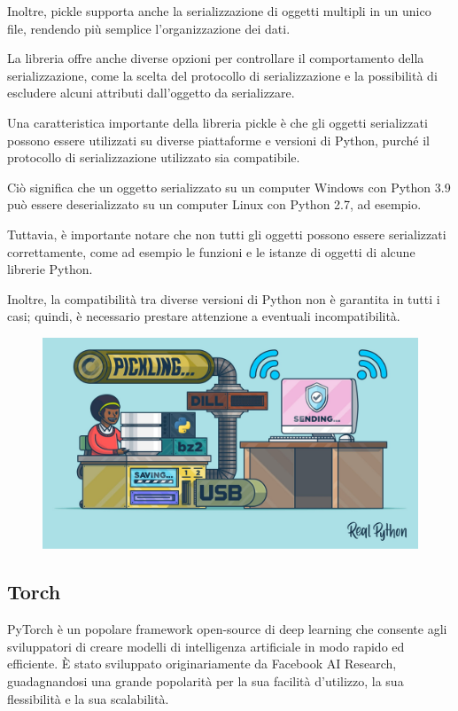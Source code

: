 Inoltre, pickle supporta anche la serializzazione di oggetti multipli in un unico file, rendendo più semplice l'organizzazione dei dati. 

La libreria offre anche diverse opzioni per controllare il comportamento della serializzazione, come la scelta del protocollo di serializzazione e la possibilità di escludere alcuni attributi dall'oggetto da serializzare.

Una caratteristica importante della libreria pickle è che gli oggetti serializzati possono essere utilizzati su diverse piattaforme e versioni di Python, purché il protocollo di serializzazione utilizzato sia compatibile. 

Ciò significa che un oggetto serializzato su un computer Windows con Python 3.9 può essere deserializzato su un computer Linux con Python 2.7, ad esempio. 

Tuttavia, è importante notare che non tutti gli oggetti possono essere serializzati correttamente, come ad esempio le funzioni e le istanze di oggetti di alcune librerie Python. 

Inoltre, la compatibilità tra diverse versioni di Python non è garantita in tutti i casi; quindi, è necessario prestare attenzione a eventuali incompatibilità.

\begin{figure}
    \begin{center}    
        \includegraphics[width=1\linewidth]{images/image6.jpeg}
    \end{center}
\end{figure}

\subsection{Torch}
PyTorch è un popolare framework open-source di deep learning che consente agli sviluppatori di creare modelli di intelligenza artificiale in modo rapido ed efficiente. È stato sviluppato originariamente da Facebook AI Research, guadagnandosi una grande popolarità per la sua facilità d'utilizzo, la sua flessibilità e la sua scalabilità.

